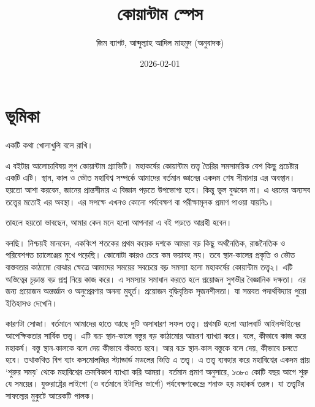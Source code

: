 \documentclass[
  letterpaper,
  DIV=11,
  numbers=noendperiod]{scrreprt}
\title{কোয়ান্টাম স্পেস}
\author{জিম ব্যাগট, আব্দুল্যাহ আদিল মাহমুদ (অনুবাদক)}
\date{2026-02-01}
\renewcommand*\contentsname{Table of contents}
\newcommand\contentsname{Table of contents}
\begin{document}
\maketitle

\renewcommand*\contentsname{Table of contents}
{
\hypersetup{linkcolor=}
\setcounter{tocdepth}{2}
\tableofcontents
}


\chapter*{ভূমিকা}\label{ux9adux9aeux995}


একটি কথা খোলাখুলি বলে রাখি।

এ বইটার আলোচ্যবিষয় লুপ কোয়ান্টাম গ্র্যাভিটি। মহাকর্ষের কোয়ান্টাম তত্ত্ব তৈরির
সমসাময়িক বেশ কিছু প্রচেষ্টার একটি এটি। স্থান, কাল ও ভৌত মহাবিশ্ব সম্পর্কে
আমাদের বর্তমান জ্ঞানের একদম শেষ সীমানায় এর অবস্থান। হয়তো আশা করবেন, জ্ঞানের
প্রান্তসীমার এ বিজ্ঞান পড়তে উপভোগ্য হবে। কিন্তু ভুল বুঝবেন না। এ ধরনের অন্যসব
তত্ত্বের মতোই এর অবস্থা। এর সপক্ষে এখনও কোনো পর্যবেক্ষণ বা পরীক্ষামূলক প্রমাণ
পাওয়া যায়নি১।

তাহলে হয়তো ভাবছেন, আমার কেন মনে হলো আপনারা এ বই পড়তে আগ্রহী হবেন।

বলছি। নিশ্চয়ই মানবেন, একবিংশ শতকের প্রথম কয়েক দশকে আমরা বড় কিছু অর্থনৈতিক,
রাজনৈতিক ও পরিবেশগত চ্যালেঞ্জের মুখে পড়েছি। কোনোটা কারও চেয়ে কম ভয়াবহ নয়।
তবে স্থান-কালের প্রকৃতি ও ভৌত বাস্তবতার কাঠামো বোঝার ক্ষেত্রে আমাদের সময়ের
সবচেয়ে বড় সমস্যা হলো মহাকর্ষের কোয়ান্টাম তত্ত্ব২। এটি অস্তিত্বের চূড়ান্ত বড় প্রশ্ন
নিয়ে কাজ করে। এ সমস্যার সমাধান করতে হলে প্রয়োজন সুগভীর বৈজ্ঞানিক দক্ষতা। এর
জন্য প্রয়োজন অন্তর্জ্ঞান ও অনুপ্রেরণার অনন্য মুহূর্ত। প্রয়োজন বুদ্ধিবৃত্তিক সৃজনশীলতা। যা
সম্ভবত পদার্থবিদ্যার পুরো ইতিহাসও দেখেনি।

কারণটা সোজা। বর্তমানে আমাদের হাতে আছে দুটি অসাধারণ সফল তত্ত্ব। প্রথমটি হলো
অ্যালবার্ট আইনস্টাইনের আপেক্ষিকতার সার্বিক তত্ত্ব। এটি বক্র স্থান-কালে বস্তুর বড়
কাঠামোর আচরণ ব্যাখ্যা করে। বলে, কীভাবে কাজ করে মহাকর্ষ। বস্তু স্থান-কালকে বলে
দেয় কীভাবে বাঁকতে হবে। আর বক্র স্থান-কাল বস্তুকে বলে দেয়, কীভাবে চলতে হবে।
তথাকথিত বিগ ব্যাং কসমোলজির স্ট্যান্ডার্ড মডলের ভিত্তি এ তত্ত্ব। এ তত্ত্ব ব্যবহার
করে মহাবিশ্বের একদম প্রায় `শুরুর সময়' থেকে মহাবিশ্বের ক্রমবিকাশ ব্যাখ্যা করি
আমরা। বর্তমান প্রমাণ অনুসারে, ১৩৮০ কোটি বছর আগে শুরু যে সময়ের। যুক্তরাষ্ট্রের
লাইগো (ও বর্তমানে ইটালির ভার্গো) পর্যবেক্ষণকেন্দ্রে শনাক্ত হয় মহাকর্ষ তরঙ্গ। যা
তত্ত্বটির সাফল্যের মুকুটে আরেকটি পালক।
\end{document}
